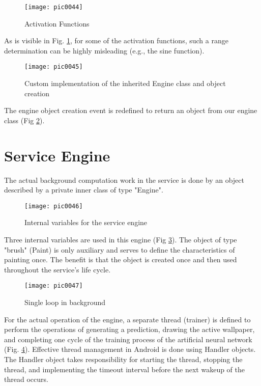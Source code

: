 \begin{figure}[h]
\centering
\texttt{[image: pic0044]}
\caption{Activation Functions \cite{afwiki}}
\label{fig:pic0044}
\end{figure}
\FloatBarrier

As is visible in Fig. \ref{fig:pic0044}, for some of the activation functions, such a range determination can be highly misleading (e.g., the sine function).

\begin{figure}[h]
\centering
\texttt{[image: pic0045]}
\caption{Custom implementation of the inherited Engine class and object creation}
\label{fig:pic0045}
\end{figure}
\FloatBarrier

The engine object creation event is redefined to return an object from our engine class (Fig \ref{fig:pic0045}).

\section{Service Engine}

The actual background computation work in the service is done by an object described by a private inner class of type "Engine".

\begin{figure}[h]
\centering
\texttt{[image: pic0046]}
\caption{Internal variables for the service engine}
\label{fig:pic0046}
\end{figure}
\FloatBarrier

Three internal variables are used in this engine (Fig \ref{fig:pic0046}). The object of type "brush" (Paint) is only auxiliary and serves to define the characteristics of painting once. The benefit is that the object is created once and then used throughout the service's life cycle.

\begin{figure}[h]
\centering
\texttt{[image: pic0047]}
\caption{Single loop in background}
\label{fig:pic0047}
\end{figure}
\FloatBarrier

For the actual operation of the engine, a separate thread (trainer) is defined to perform the operations of generating a prediction, drawing the active wallpaper, and completing one cycle of the training process of the artificial neural network (Fig. \ref {fig:pic0047}). Effective thread management in Android is done using Handler objects. The Handler object takes responsibility for starting the thread, stopping the thread, and implementing the timeout interval before the next wakeup of the thread occurs.

